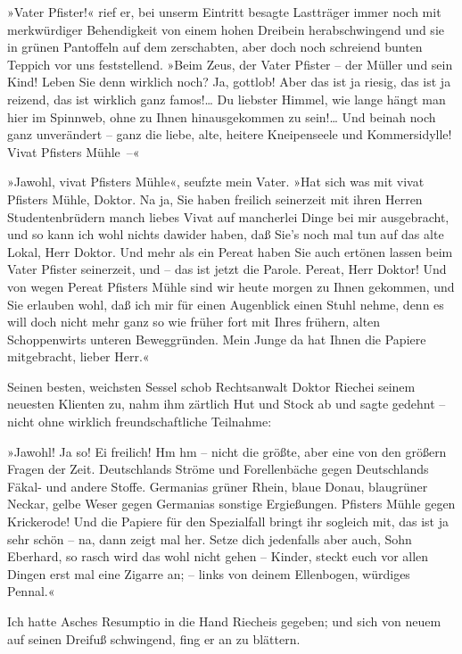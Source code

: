 »Vater Pfister!« rief er, bei unserm Eintritt besagte Lastträger
immer noch mit merkwürdiger Behendigkeit von einem hohen Dreibein
herabschwingend und sie in grünen Pantoffeln auf dem zerschabten,
aber doch noch schreiend bunten Teppich vor uns feststellend. »Beim
Zeus, der Vater Pfister – der Müller und sein Kind! Leben Sie denn
wirklich noch? Ja, gottlob! Aber das ist ja riesig, das ist ja
reizend, das ist wirklich ganz famos!\ldots{} Du liebster Himmel, wie
lange hängt man hier im Spinnweb, ohne zu Ihnen hinausgekommen zu
sein!\ldots{} Und beinah noch ganz unverändert – ganz die liebe, alte,
heitere Kneipenseele und Kommersidylle! Vivat Pfisters Mühle~–«

»Jawohl, vivat Pfisters Mühle«, seufzte mein Vater. »Hat sich was
mit vivat Pfisters Mühle, Doktor. Na ja, Sie haben freilich
seinerzeit mit ihren Herren Studentenbrüdern manch liebes Vivat auf
mancherlei Dinge bei mir ausgebracht, und so kann ich wohl nichts
dawider haben, daß Sie's noch mal tun auf das alte Lokal, Herr
Doktor. Und mehr als ein Pereat haben Sie auch ertönen lassen beim
Vater Pfister seinerzeit, und – das ist jetzt die Parole. Pereat,
Herr Doktor! Und von wegen Pereat Pfisters Mühle sind wir heute
morgen zu Ihnen gekommen, und Sie erlauben wohl, daß ich mir für
einen Augenblick einen Stuhl nehme, denn es will doch nicht mehr
ganz so wie früher fort mit Ihres frühern, alten Schoppenwirts
unteren Beweggründen. Mein Junge da hat Ihnen die Papiere
mitgebracht, lieber Herr.«

Seinen besten, weichsten Sessel schob Rechtsanwalt Doktor Riechei
seinem neuesten Klienten zu, nahm ihm zärtlich Hut und Stock ab und
sagte gedehnt – nicht ohne wirklich freundschaftliche Teilnahme:

»Jawohl! Ja so! Ei freilich! Hm hm – nicht die größte, aber eine
von den größern Fragen der Zeit. Deutschlands Ströme und
Forellenbäche gegen Deutschlands Fäkal- und andere Stoffe.
Germanias grüner Rhein, blaue Donau, blaugrüner Neckar, gelbe Weser
gegen Germanias sonstige Ergießungen. Pfisters Mühle gegen
Krickerode! Und die Papiere für den Spezialfall bringt ihr sogleich
mit, das ist ja sehr schön – na, dann zeigt mal her. Setze dich
jedenfalls aber auch, Sohn Eberhard, so rasch wird das wohl nicht
gehen – Kinder, steckt euch vor allen Dingen erst mal eine Zigarre
an; – links von deinem Ellenbogen, würdiges Pennal.«

Ich hatte Asches Resumptio in die Hand Riecheis gegeben; und sich
von neuem auf seinen Dreifuß schwingend, fing er an zu blättern.

